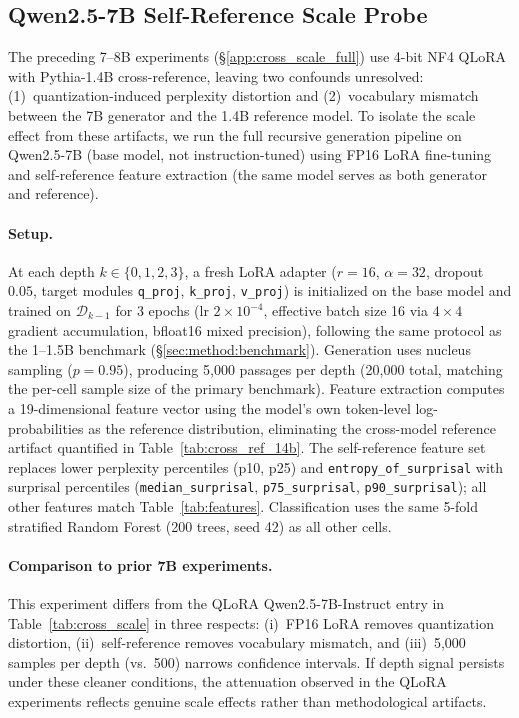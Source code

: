 \subsection{Qwen2.5-7B Self-Reference Scale Probe}
\label{app:qwen7b_selfref}

The preceding 7--8B experiments (\S\ref{app:cross_scale_full}) use 4-bit NF4 QLoRA with Pythia-1.4B cross-reference, leaving two confounds unresolved: (1)~quantization-induced perplexity distortion and (2)~vocabulary mismatch between the 7B generator and the 1.4B reference model.
To isolate the scale effect from these artifacts, we run the full recursive generation pipeline on Qwen2.5-7B \cite{qwen2.5} (base model, not instruction-tuned) using FP16 LoRA fine-tuning and self-reference feature extraction (the same model serves as both generator and reference).

\paragraph{Setup.}
At each depth $k \in \{0, 1, 2, 3\}$, a fresh LoRA adapter ($r{=}16$, $\alpha{=}32$, dropout $0.05$, target modules \texttt{q\_proj}, \texttt{k\_proj}, \texttt{v\_proj}) is initialized on the base model and trained on $\mathcal{D}_{k-1}$ for 3 epochs (lr $2{\times}10^{-4}$, effective batch size 16 via $4 \times 4$ gradient accumulation, bfloat16 mixed precision), following the same protocol as the 1--1.5B benchmark (\S\ref{sec:method:benchmark}).
Generation uses nucleus sampling ($p{=}0.95$), producing 5{,}000 passages per depth (20{,}000 total, matching the per-cell sample size of the primary benchmark).
Feature extraction computes a 19-dimensional feature vector using the model's own token-level log-probabilities as the reference distribution, eliminating the cross-model reference artifact quantified in Table~\ref{tab:cross_ref_14b}.
The self-reference feature set replaces lower perplexity percentiles (p10, p25) and \texttt{entropy\_of\_surprisal} with surprisal percentiles (\texttt{median\_surprisal}, \texttt{p75\_surprisal}, \texttt{p90\_surprisal}); all other features match Table~\ref{tab:features}.
Classification uses the same 5-fold stratified Random Forest (200 trees, seed 42) as all other cells.

\paragraph{Comparison to prior 7B experiments.}
This experiment differs from the QLoRA Qwen2.5-7B-Instruct entry in Table~\ref{tab:cross_scale} in three respects: (i)~FP16 LoRA removes quantization distortion, (ii)~self-reference removes vocabulary mismatch, and (iii)~5{,}000 samples per depth (vs.\ 500) narrows confidence intervals.
If depth signal persists under these cleaner conditions, the attenuation observed in the QLoRA experiments reflects genuine scale effects rather than methodological artifacts.

